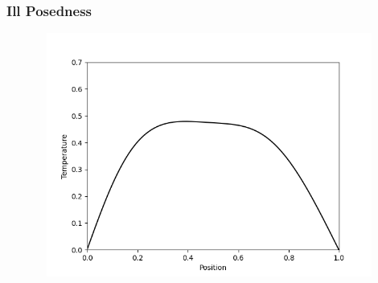 \documentclass{beamer}
\begin{document}
  




\begin{frame}
  \frametitle{Ill Posedness}
  \begin{figure}
    \centering
    \href{run:reverse_heat_equation.mp4}{\includegraphics[width=12cm,height=8cm]{reverse_heat_equation.png}}    
  \end{figure}
\end{frame}
\end{document}
